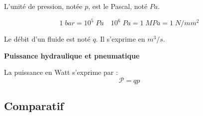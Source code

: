 \documentclass[10pt]{article}
\begin{document}
L'unité de pression, notée $p$, est le Pascal, noté $Pa$.
\begin{resultat}
$$
1\; bar = 10^5\; Pa \quad 10^6 \; Pa = 1 \; MPa = 1\; N/mm^2
$$
\end{resultat}

Le débit d'un fluide est noté $q$. Il s'exprime en $m^3/s$. 

\begin{resultat}
\textbf{Puissance hydraulique et pneumatique}

La puissance en Watt s'exprime par :
$$ 
\mathcal{P} = qp
$$


\end{resultat}

\subsection{Comparatif}
\end{document}
